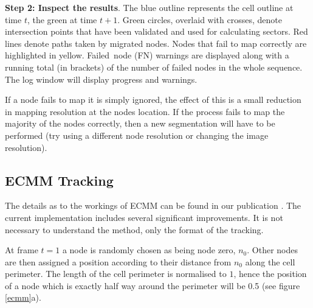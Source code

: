 \documentclass[a4paper,12pt]{article}
\begin{document}
\textbf{Step 2: Inspect the results}.  The blue outline represents the cell outline at time $t$, the green at time $t+1$.  
Green circles, overlaid with crosses, denote intersection points that have been validated and used for calculating sectors.  
Red lines denote paths taken by migrated nodes.   Nodes that fail to map correctly are highlighted in yellow.
Failed~node (FN) warnings are displayed along with a running total (in brackets) of the number of failed nodes in the whole sequence.  
The log window will display progress and warnings. 

If a node fails to map it is simply ignored, the effect of this is a small reduction in mapping resolution at the nodes location.
If the process fails to map the majority of the nodes correctly, then a new segmentation will have to be performed
(try using a different node resolution or changing the image resolution).

\subsection{ECMM Tracking}
\label{ecmmTracking}

The details as to the workings of ECMM can be found in our publication \cite{Tyson2010}.
The current implementation includes several significant improvements.  It is not necessary to understand the method,
only the format of the tracking.

At frame $t=1$ a node is randomly chosen as being node zero, $n_{0}$.  Other nodes are then assigned a position
according to their distance from $n_{0}$ along the cell perimeter.  The length of the cell perimeter 
is normalised to $1$, hence the position of a node which is exactly half way around the perimeter will be 0.5
(see figure \ref{ecmm}a).
\end{document}
